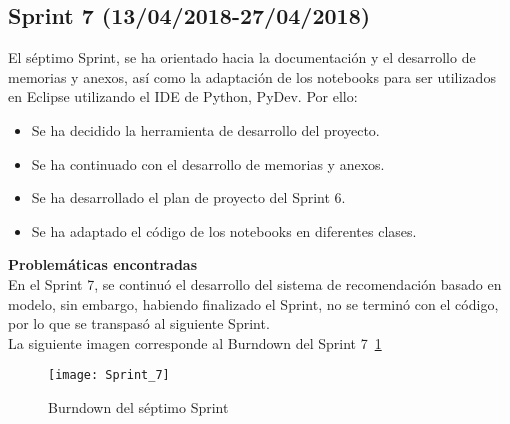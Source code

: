 \subsection{\textbf{Sprint 7} (13/04/2018-27/04/2018) }
El séptimo  Sprint, se ha orientado hacia la documentación y  el desarrollo de memorias y anexos, así como la adaptación de los notebooks para ser utilizados en Eclipse utilizando el IDE de Python, PyDev. 
Por ello: 
\begin{itemize}
\item Se ha decidido la herramienta de desarrollo del proyecto. 
\item Se ha continuado con el desarrollo de memorias y anexos. 
\item Se ha desarrollado el plan de proyecto del Sprint 6.
\item Se ha adaptado el código de los notebooks en diferentes clases. 

\end{itemize}
\textbf{Problemáticas encontradas}\\En el Sprint 7, se continuó el desarrollo del sistema de recomendación basado en modelo, sin embargo, habiendo finalizado el Sprint, no se terminó con el código, por lo que se transpasó al  siguiente Sprint. 
 \\La siguiente imagen corresponde al Burndown del Sprint 7~\ref{fig:A.2.7}
\begin{figure}[h]
\centering
\texttt{[image: Sprint\_7]}
\caption{Burndown del séptimo Sprint}
\label{fig:A.2.7}
\end{figure}
\\


